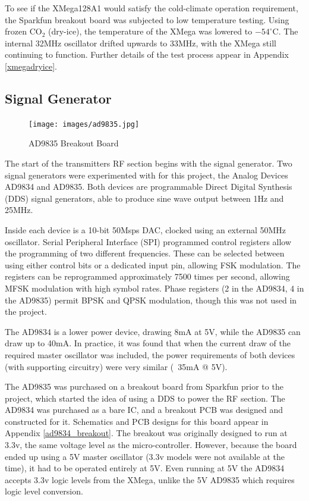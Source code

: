 \documentclass[a4paper,12pt]{article}
\begin{document}
To see if the XMega128A1 would satisfy the cold-climate operation requirement, the Sparkfun breakout board was subjected to low temperature testing. Using frozen CO$_2$ (dry-ice), the temperature of the XMega was lowered to $-54^\circ$C. The internal 32MHz oscillator drifted upwards to 33MHz, with the XMega still continuing to function. Further details of the test process appear in  Appendix \ref{xmegadryice}.


\subsection{Signal Generator}
\begin{figure}
  \begin{center}
    \texttt{[image: images/ad9835.jpg]}
  \end{center}
  \caption{AD9835 Breakout Board}
  \label{fig:ad9835}
\end{figure}
The start of the transmitters RF section begins with the signal generator. Two signal generators were experimented with for this project, the Analog Devices AD9834 and AD9835. Both devices are programmable Direct Digital Synthesis (DDS) signal generators, able to produce sine wave output between 1Hz and 25MHz. 

Inside each device is a 10-bit 50Msps DAC, clocked using an external 50MHz oscillator. Serial Peripheral Interface (SPI) programmed control registers allow the programming of two different frequencies. These can be selected between using either control bits or a dedicated input pin, allowing FSK modulation. The registers can be reprogrammed approximately 7500 times per second, allowing MFSK modulation with high symbol rates. Phase registers (2 in the AD9834, 4 in the AD9835) permit BPSK and QPSK modulation, though this was not used in the project.

The AD9834 is a lower power device, drawing 8mA at 5V, while the AD9835 can draw up to 40mA. In practice, it was found that when the current draw of the required master oscillator was included, the power requirements of both devices (with supporting circuitry) were very similar (~35mA @ 5V).

The AD9835 was purchased on a breakout board from Sparkfun prior to the project, which started the idea of using a DDS to power the RF section. The AD9834 was purchased as a bare IC, and a breakout PCB was designed and constructed for it. Schematics and PCB designs for this board appear in Appendix \ref{ad9834_breakout}. The breakout was originally designed to run at 3.3v, the same voltage level as the micro-controller. However, because the board ended up using a 5V master oscillator (3.3v models were not available at the time), it had to be operated entirely at 5V. Even running at 5V the AD9834 accepts 3.3v logic levels from the XMega, unlike the 5V AD9835 which requires logic level conversion.
\end{document}
